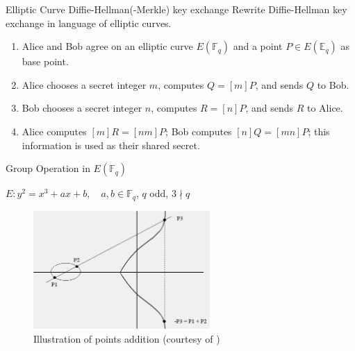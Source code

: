 \documentclass{beamer}
\begin{document}
\begin{frame}{Elliptic Curve Diffie-Hellman(-Merkle) key exchange}
Rewrite Diffie-Hellman key exchange in language of elliptic curves.

\begin{enumerate}
    \item Alice and Bob agree on an elliptic curve $E(\mathbb{F}_q)$ and 
a point $P\in E(\mathbb{E}_q)$ as base point. 
    \item Alice chooses a secret integer $m$, computes $Q = [m]P$, and
sends $Q$ to Bob.
    \item Bob chooses a secret integer $n$, computes $R = [n] P$, and
sends $R$ to Alice.
    \item Alice computes $[m]R = [nm]P$; Bob computes $[n]Q =
[mn]P$; this information is used as their shared secret.
\end{enumerate}

\end{frame}

\begin{frame}{Group Operation in $E(\mathbb{F}_q)$}


\begin{center}
{\Large 
$E: y^2 = x^3 + a x + b, \quad a, b\in \mathbb{F}_q$, $q$ odd, $3\nmid q$
}
\end{center}
\begin{figure}[htbp]
\centering
  \includegraphics[width=0.6\textwidth]{img/ecurve_arith.pdf}
  \caption{Illustration of points addition (courtesy of )}
  \label{fig:ecurve_arith}
\end{figure}

\end{frame}
\end{document}
